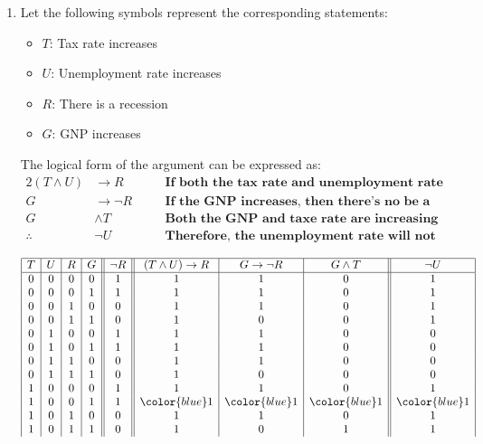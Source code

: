 \begin{enumerate}[label=(\alph*)]
    \item Let the following symbols represent the corresponding statements:
    \begin{itemize}
        \item $T$: Tax rate increases
        \item $U$: Unemployment rate increases
        \item $R$: There is a recession
        \item $G$: GNP increases
    \end{itemize}
    The logical form of the argument can be expressed as:
    \begin{alignat*}{2}
        (T \wedge U) & \rightarrow R && \quad \textbf{If both the tax rate and unemployment rate increase, then there's a recession} \\
        G & \rightarrow \neg R && \quad \textbf{If the GNP increases, then there's no be a recession} \\
        G & \wedge T && \quad \textbf{Both the GNP and taxe rate are increasing} \\
        \bm{\therefore} & \neg U && \quad \textbf{Therefore, the unemployment rate will not increase}
    \end{alignat*}

    \[
    \begin{array}{|c|c|c|c||c||c|c|c||c|}
    \hline
    T & U & R & G & \neg R & (T \wedge U) \rightarrow R & G \rightarrow \neg R & G \wedge T & \neg U\\
    \hline
    0 & 0 & 0 & 0 & 1 & 1 & 1 & 0 & 1 \\
    0 & 0 & 0 & 1 & 1 & 1 & 1 & 0 & 1 \\
    0 & 0 & 1 & 0 & 0 & 1 & 1 & 0 & 1 \\
    0 & 0 & 1 & 1 & 0 & 1 & 0 & 0 & 1 \\

    0 & 1 & 0 & 0 & 1 & 1 & 1 & 0 & 0 \\
    0 & 1 & 0 & 1 & 1 & 1 & 1 & 0 & 0 \\
    0 & 1 & 1 & 0 & 0 & 1 & 1 & 0 & 0 \\
    0 & 1 & 1 & 1 & 0 & 1 & 0 & 0 & 0 \\

    1 & 0 & 0 & 0 & 1 & 1 & 1 & 0 & 1 \\
    1 & 0 & 0 & 1 & 1 & \color{blue}1 & \color{blue}1 & \color{blue}1 & \color{blue}1 \\
    1 & 0 & 1 & 0 & 0 & 1 & 1 & 0 & 1 \\
    1 & 0 & 1 & 1 & 0 & 1 & 0 & 1 & 1 \\


\end{array}\]
\end{enumerate}
